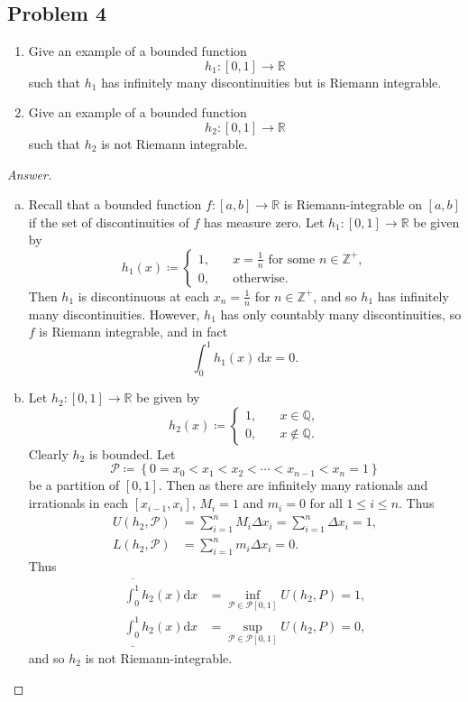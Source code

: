 \documentclass[12pt]{article}
\newcommand{\z}{\mathbb{Z}}
\newcommand{\q}{\mathbb{Q}}
\newcommand{\real}{\mathbb{R}}
\newcommand\setb[1]{\left \{ #1 \right \}}
\newcommand{\sqbrack}[1]{\left [ #1 \right ]}
\theoremstyle{definition}
\begin{document}
\subsection{Problem 4}
\begin{enumerate}
    \item Give an example of a bounded function 
    \[
        h_1 : [0,1] \to \real
    \]
    such that $h_1$ has infinitely many discontinuities but is Riemann integrable.
    \item Give an example of a bounded function 
    \[
        h_2 : [0,1] \to \real
    \]
    such that $h_2$ is not Riemann integrable.
\end{enumerate}
\begin{proof}[Answer]
    \noindent 
    \begin{enumerate}[a)]
        \item Recall that a bounded function $f : [a,b] \to \real$ is Riemann-integrable on $[a,b]$ if the set of discontinuities of $f$ has measure zero. Let $h_1 :[0,1] \to \real$ be given by 
        \[
            h_1(x) \coloneqq 
            \begin{cases}
                1 , & \quad x = \frac{1}{n} \text{ for some } n \in \z^+ , \\
                0 , & \quad \text{otherwise}.
            \end{cases}
        \]
        Then $h_1$ is discontinuous at each $x_n = \frac{1}{n}$ for $n \in \z^+$, and so $h_1$ has infinitely many discontinuities. However, $h_1$ has only countably many discontinuities, so $f$ is Riemann integrable, and in fact 
        \[
            \int_0^1 h_1(x) \, \mathrm{d}x = 0.
        \]
        \item Let $h_2 : [0,1] \to \real$ be given by 
        \[
            h_2(x) \coloneqq 
            \begin{cases}
                1 , & \quad x \in \q, \\
                0 , & \quad x \notin \q.
            \end{cases}
        \]
        Clearly $h_2$ is bounded. Let 
        \[
            \mathcal{P} \coloneqq \setb{ 0 = x_0 < x_1 < x_2 < \dotsb < x_{n-1} < x_n = 1 }
        \]
        be a partition of $[0,1]$. Then as there are infinitely many rationals and irrationals in each $\sqbrack{ x_{i-1} , x_i }$, $M_i = 1$ and $m_i = 0$ for all $1 \leq i \leq n$. Thus
        \begin{align*}
            U(h_2,\mathcal{P}) & = \sum\limits_{i = 1}^n M_i \Delta x_i = \sum\limits_{i = 1}^n \Delta x_i = 1, \\
            L(h_2,\mathcal{P}) & = \sum\limits_{i = 1}^n m_i \Delta x_i = 0.
        \end{align*}
        Thus 
        \begin{align*}
            \overline{\int_0^1} h_2(x) \mathrm{d}x & = \inf\limits_{\mathcal{P} \in \mathscr{P}[0,1]} U(h_2,P) = 1, \\
            \underline{\int_0^1} h_2(x) \mathrm{d}x & = \sup\limits_{\mathcal{P} \in \mathscr{P}[0,1]} U(h_2,P) = 0,
        \end{align*}
        and so $h_2$ is not Riemann-integrable.
    \end{enumerate}
\end{proof}
\end{document}
